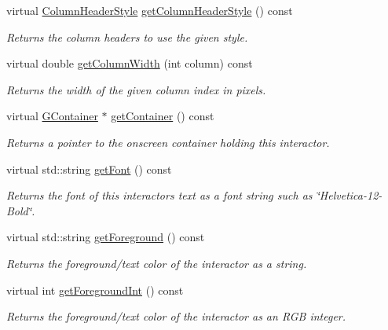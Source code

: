 \begin{DoxyCompactItemize}
virtual \mbox{\hyperlink{classsgl_1_1GTable_a060cff504451bbb98530e64e936e2671}{Column\+Header\+Style}} \mbox{\hyperlink{classsgl_1_1GTable_a31ffc9e14dda3e91d1a1b3be81a42db8}{get\+Column\+Header\+Style}} () const
\begin{DoxyCompactList}\small\item\em Returns the column headers to use the given style. \end{DoxyCompactList}\item 
virtual double \mbox{\hyperlink{classsgl_1_1GTable_a4722043b7c3f968238968d3053b8a277}{get\+Column\+Width}} (int column) const
\begin{DoxyCompactList}\small\item\em Returns the width of the given column index in pixels. \end{DoxyCompactList}\item 
virtual \mbox{\hyperlink{classsgl_1_1GContainer}{G\+Container}} $\ast$ \mbox{\hyperlink{classsgl_1_1GInteractor_a7a6e317c29d61030929b4cd2d1c00fe7}{get\+Container}} () const
\begin{DoxyCompactList}\small\item\em Returns a pointer to the onscreen container holding this interactor. \end{DoxyCompactList}\item 
virtual std\+::string \mbox{\hyperlink{classsgl_1_1GInteractor_a894a5502900794eeb27d084c21f1d77d}{get\+Font}} () const
\begin{DoxyCompactList}\small\item\em Returns the font of this interactor\textquotesingle{}s text as a font string such as \char`\"{}\+Helvetica-\/12-\/\+Bold\char`\"{}. \end{DoxyCompactList}\item 
virtual std\+::string \mbox{\hyperlink{classsgl_1_1GInteractor_a4fa2d8b0192a3a5b4af4bbfe71194d03}{get\+Foreground}} () const
\begin{DoxyCompactList}\small\item\em Returns the foreground/text color of the interactor as a string. \end{DoxyCompactList}\item 
virtual int \mbox{\hyperlink{classsgl_1_1GInteractor_ac3b12ab385a6ef9ae90fc879860ba726}{get\+Foreground\+Int}} () const
\begin{DoxyCompactList}\small\item\em Returns the foreground/text color of the interactor as an R\+GB integer. \end{DoxyCompactList}\item 

\end{DoxyCompactItemize}
